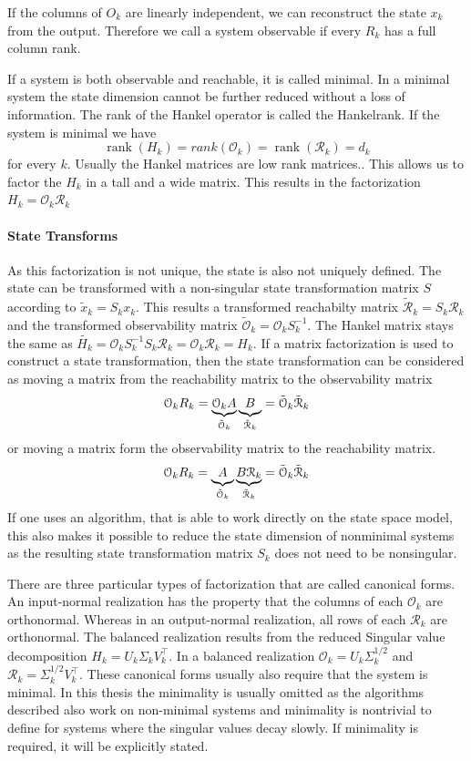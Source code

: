 \documentclass[numbers=noenddot,doctype=mastersthesis,BCOR=15mm,biblatex]{ldvbook}%
\DeclareMathOperator{\rank}{rank}
\newcommand{\R}{\mathcal{R}} %
\newcommand{\Ob}{\mathcal{O}} %
\begin{document}
If the columns of $O_k$ are linearly independent, we can reconstruct the state $x_k$ from the output.  
Therefore we call a system observable if every $R_k$ has a full column rank.

If a system is both observable and reachable, it is called minimal.
In a minimal system the state dimension cannot be further reduced without a loss of information.
The rank of the Hankel operator is called the Hankelrank. 
If the system is minimal we have 
\begin{equation}
	\rank(H_k) = rank(\Ob_k) = \rank(\R_k) = d_k
\end{equation}
for every $k$.
Usually the Hankel matrices are low rank matrices..
This allows us to factor the $H_k$ in a tall and a wide matrix. 
This results in the factorization $H_k = \Ob_k\R_k$

\paragraph{State Transforms}
As this factorization is not unique, the state is also not uniquely defined. 
The state can be transformed with a non-singular state transformation matrix $S$ according to $\tilde{x}_k =S_kx_k$.
This results a transformed 
reachabilty matrix $\tilde{\R}_k=S_k \R_k$ and the transformed
observability matrix $\tilde{\Ob}_k= \Ob_k S_k^{-1}$. 
The Hankel matrix stays the same as $\tilde{H_k} = \Ob_k S_k^{-1} S_k \R_k= \Ob_k \R_k = H_k$.
If a matrix factorization is used to construct a state transformation, then the state transformation can be considered as moving a matrix from the reachability matrix to the observability matrix
\begin{equation}
	\Ob_{k}R_{k} = \underbrace{\Ob_{k}A}_{\tilde{\Ob}_k}\underbrace{B\vphantom{\Ob_k}}_{\tilde{\R}_k} = \tilde{\Ob}_k\tilde{\R}_k
\end{equation}
or moving a matrix form the observability matrix to the reachability matrix.
\begin{equation}
\Ob_{k}R_{k} = \underbrace{A\vphantom{\R_k}}_{\tilde{\Ob}_k}\underbrace{B\R_{k}}_{\tilde{\R}_k} = \tilde{\Ob}_k\tilde{\R}_k
\end{equation}
If one uses an algorithm, that is able to work directly on the state space model, this also makes it possible to reduce the state dimension of nonminimal systems as the resulting state transformation matrix $S_k$ does not need to be nonsingular.

There are three particular types of factorization that are called canonical forms.
An input-normal realization has the property that the columns of each $\Ob_k$ are orthonormal. Whereas in an output-normal realization, all rows of each $\R_k$ are orthonormal.
The balanced realization results from the reduced Singular value decomposition $H_k = U_k \Sigma_k V_k^\top$. 
In a balanced realization $\Ob_k = U_k \Sigma^{1/2}_k$ and $\R_k = \Sigma^{1/2}_k V_k^\top$.
These canonical forms usually also require that the system is minimal. In this thesis the minimality is usually omitted as the algorithms described also work on non-minimal systems and minimality is nontrivial to define for systems where the singular values decay slowly. If minimality is required, it will be explicitly stated.
\end{document}
